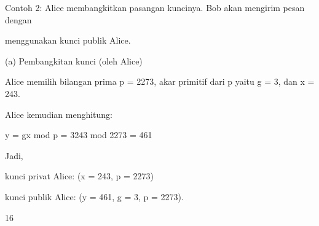 \documentclass{article}
\begin{document}

Contoh 2: Alice membangkitkan pasangan kuncinya. Bob akan mengirim pesan dengan 

menggunakan kunci publik Alice. 

(a) Pembangkitan kunci (oleh Alice)

     Alice memilih bilangan prima p = 2273, akar primitif dari p yaitu g = 3, dan x = 243. 

  Alice kemudian menghitung:

y = gx mod p = 3243 mod 2273 = 461

Jadi,

   kunci privat Alice: (x = 243, p = 2273) 

    kunci publik Alice: (y = 461, g = 3, p = 2273). 

16
\end{document}
